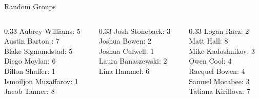 \documentclass[10pt]{beamer}
\begin{document}
\begin{frame}{Random Groups}

\begin{columns}
\begin{column}{0.33\textwidth}
Aubrey Williams: 5 \\ 
Austin Barton : 7 \\ 
Blake Sigmundstad: 5 \\ 
Diego Moylan: 6 \\ 
Dillon Shaffer: 1 \\ 
Ismoiljon Muzaffarov: 1 \\ 
Jacob Tanner: 8 \\\end{column}
\begin{column}{0.33\textwidth}
Josh Stoneback: 3 \\ 
Joshua Bowen: 2 \\ 
Joshua Culwell: 1 \\ 
Laura Banaszewski: 2 \\ 
Lina Hammel: 6 \\\end{column}
\begin{column}{0.33\textwidth}
Logan Racz: 2 \\ 
Matt Hall: 8 \\ 
Mike Kadoshnikov: 3 \\ 
Owen Cool: 4 \\ 
Racquel Bowen: 4 \\ 
Samuel Mocabee: 3 \\ 
Tatiana Kirillova: 7 \\\end{column}
\end{columns}

\end{frame}
\end{document}
